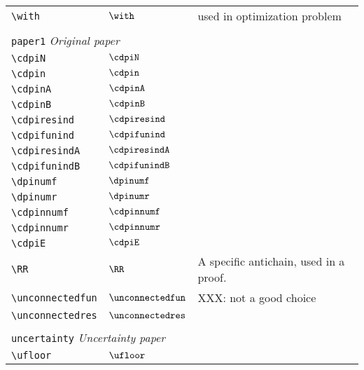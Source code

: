 \begin{longtable}{lll}
 {\color[rgb]{0.5,0.5,0.5}\texttt{\textbackslash with}} & $\with$ &  used in optimization problem\\ 
  &  & \\ 
 \multicolumn{3}{l}{{\color[rgb]{0.5,0.5,0.5}\texttt{paper1}} \emph{Original paper}}\\ 
 \hline
\hline
{\color[rgb]{0.5,0.5,0.5}\texttt{\textbackslash cdpiN}} & $\cdpiN$ & \\ 
 {\color[rgb]{0.5,0.5,0.5}\texttt{\textbackslash cdpin}} & $\cdpin$ & \\ 
 {\color[rgb]{0.5,0.5,0.5}\texttt{\textbackslash cdpinA}} & $\cdpinA$ & \\ 
 {\color[rgb]{0.5,0.5,0.5}\texttt{\textbackslash cdpinB}} & $\cdpinB$ & \\ 
 {\color[rgb]{0.5,0.5,0.5}\texttt{\textbackslash cdpiresind}} & $\cdpiresind$ & \\ 
 {\color[rgb]{0.5,0.5,0.5}\texttt{\textbackslash cdpifunind}} & $\cdpifunind$ & \\ 
 {\color[rgb]{0.5,0.5,0.5}\texttt{\textbackslash cdpiresindA}} & $\cdpiresindA$ & \\ 
 {\color[rgb]{0.5,0.5,0.5}\texttt{\textbackslash cdpifunindB}} & $\cdpifunindB$ & \\ 
 {\color[rgb]{0.5,0.5,0.5}\texttt{\textbackslash dpinumf}} & $\dpinumf$ & \\ 
 {\color[rgb]{0.5,0.5,0.5}\texttt{\textbackslash dpinumr}} & $\dpinumr$ & \\ 
 {\color[rgb]{0.5,0.5,0.5}\texttt{\textbackslash cdpinnumf}} & $\cdpinnumf$ & \\ 
 {\color[rgb]{0.5,0.5,0.5}\texttt{\textbackslash cdpinnumr}} & $\cdpinnumr$ & \\ 
 {\color[rgb]{0.5,0.5,0.5}\texttt{\textbackslash cdpiE}} & $\cdpiE$ & \\ 
 {\color[rgb]{0.5,0.5,0.5}\texttt{\textbackslash RR}} & $\RR$ &  A specific antichain, used in a proof.\\ 
 {\color[rgb]{0.5,0.5,0.5}\texttt{\textbackslash unconnectedfun}} & $\unconnectedfun$ &  XXX: not a good choice\\ 
 {\color[rgb]{0.5,0.5,0.5}\texttt{\textbackslash unconnectedres}} & $\unconnectedres$ & \\ 
  &  & \\ 
 \multicolumn{3}{l}{{\color[rgb]{0.5,0.5,0.5}\texttt{uncertainty}} \emph{Uncertainty paper}}\\ 
 \hline
\hline
{\color[rgb]{0.5,0.5,0.5}\texttt{\textbackslash ufloor}} & $\ufloor$ & \\ 

\end{longtable}
